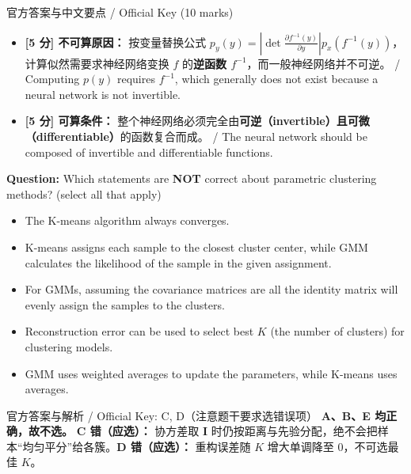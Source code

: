 \begin{StudySolution}{官方答案与中文要点 / Official Key (10 marks)}
\begin{itemize}
\item \textbf{[5 分] 不可算原因：} 按变量替换公式 $p_y(y)=\left|\det\frac{\partial f^{-1}(y)}{\partial y}\right|p_x(f^{-1}(y))$，计算似然需要求神经网络变换 $f$ 的\textbf{逆函数 $f^{-1}$}，而一般神经网络并不可逆。 / Computing $p(y)$ requires $f^{-1}$, which generally does not exist because a neural network is not invertible.
\item \textbf{[5 分] 可算条件：} 整个神经网络必须完全由\textbf{可逆（invertible）且可微（differentiable）}的函数复合而成。 / The neural network should be composed of invertible and differentiable functions.
\end{itemize}
\end{StudySolution}




\textbf{Question:} Which statements are \textbf{NOT} correct about parametric clustering methods? (select all that apply)
\begin{itemize}
\item[A)] The K-means algorithm always converges.
\item[B)] K-means assigns each sample to the closest cluster center, while GMM calculates the likelihood of the sample in the given assignment.
\item[C)] For GMMs, assuming the covariance matrices are all the identity matrix will evenly assign the samples to the clusters.
\item[D)] Reconstruction error can be used to select best $K$ (the number of clusters) for clustering models.
\item[E)] GMM uses weighted averages to update the parameters, while K-means uses averages.
\end{itemize}

\begin{StudySolution}{官方答案与解析 / Official Key: C, D（注意题干要求选错误项）}
\textbf{A、B、E 均正确，故不选。} \textbf{C 错（应选）：} 协方差取 $\mathbf{I}$ 时仍按距离与先验分配，绝不会把样本“均匀平分”给各簇。\textbf{D 错（应选）：} 重构误差随 $K$ 增大单调降至 0，不可选最佳 $K$。
\end{StudySolution}

